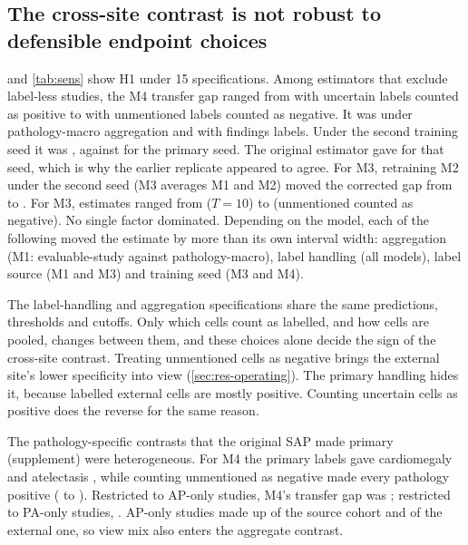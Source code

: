 \subsection{The cross-site contrast is not robust to defensible endpoint choices}
\label{sec:res-sensitivity}
 and \cref{tab:sens} show H1 under 15 specifications. Among
estimators that exclude label-less studies, the M4 transfer gap ranged from
\SensUncPosHOneMFour{} with uncertain labels counted as positive to
\SensUnmNegHOneMFour{} with unmentioned labels counted as negative. It was
\SensMacroHOneMFour{} under pathology-macro aggregation and
\SensFindHOneMFour{} with findings labels. Under the second training seed it was
\SensSeedHOneMFour{}, against \HOneMFourEval{} for the primary seed. The
original estimator gave \SensSeedOrigHOneMFour{} for that seed, which is why the
earlier replicate appeared to agree. For M3, retraining M2 under the second
seed (M3 averages M1 and M2) moved the corrected gap from \HOneMThreeEval{} to
\SensSeedHOneMThree{}. For M3, estimates ranged from
\SensTTenHOneMThreePt{} ($T=10$) to \SensUnmNegHOneMThreePt{} (unmentioned
counted as negative). No single factor dominated. Depending on the model, each
of the following moved the estimate by more than its own interval width:
aggregation (M1: \SensEvalHOneMOnePt{} evaluable-study against
\SensMacroHOneMOnePt{} pathology-macro), label handling (all models), label
source (M1 and M3) and training seed (M3 and M4).

The label-handling and aggregation specifications share the same predictions,
thresholds and cutoffs. Only which cells count as labelled, and how cells are
pooled, changes between them, and these choices alone decide the sign of the
cross-site contrast. Treating unmentioned cells
as negative brings the external site's lower specificity into view
(\cref{sec:res-operating}). The primary handling hides it, because labelled
external cells are mostly positive. Counting uncertain cells as positive does
the reverse for the same reason.

The pathology-specific contrasts that the original SAP made primary
(supplement) were heterogeneous. For M4 the primary labels gave cardiomegaly
\PathMFourCard{} and atelectasis \PathMFourAtel{}, while counting unmentioned as
negative made every pathology positive (\PathMFourUnmMin{} to
\PathMFourUnmMax{}). Restricted to AP-only studies, M4's
transfer gap was \ViewAPMFour{}; restricted to PA-only studies, \ViewPAMFour{}.
AP-only studies made up \APShareSrc{} of the source cohort and \APShareExt{} of
the external one, so view mix also enters the aggregate contrast.

